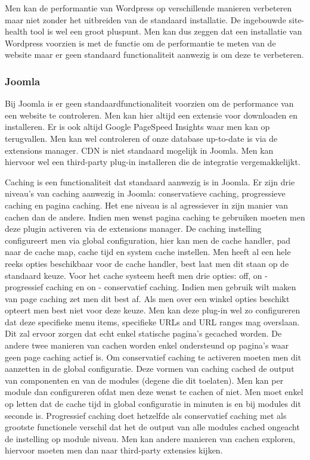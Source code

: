 Men kan de performantie van Wordpress op verschillende manieren verbeteren maar niet zonder het uitbreiden van de standaard installatie. De ingebouwde site-health tool is wel een groot pluspunt. Men kan dus zeggen dat een installatie van Wordpress voorzien is met de functie om de performantie te meten van de website maar er geen standaard functionaliteit aanwezig is om deze te verbeteren.

\subsubsection{Joomla}
Bij Joomla is er geen standaardfunctionaliteit voorzien om de performance van een website te controleren. Men kan hier altijd een extensie voor downloaden en installeren. Er is ook altijd Google PageSpeed Insights waar men kan op terugvallen. Men kan wel controleren of onze database up-to-date is via de extensions manager. CDN is niet standaard mogelijk in Joomla. Men kan hiervoor wel een third-party plug-in installeren die de integratie vergemakkelijkt.

Caching is een functionaliteit dat standaard aanwezig is in Joomla. Er zijn drie niveau's van caching aanwezig in Joomla: conservatieve caching, progressieve caching en pagina caching. Het ene niveau is al agressiever in zijn manier van cachen dan de andere. Indien men wenst pagina caching te gebruiken moeten men deze plugin activeren via de extensions manager. De caching instelling configureert men via global configuration, hier kan men de cache handler, pad naar de cache map, cache tijd en system cache instellen. Men heeft al een hele reeks opties beschikbaar voor de cache handler, best laat men dit staan op de standaard keuze. Voor het cache systeem heeft men drie opties: off, on - progressief caching en on - conservatief caching. Indien men gebruik wilt maken van page caching zet men dit best af. Als men over een winkel opties beschikt opteert men best niet voor deze keuze. Men kan deze plug-in wel zo configureren dat deze specifieke menu items, specifieke URLs and URL ranges mag overslaan. Dit zal ervoor zorgen dat echt enkel statische pagina's gecached worden. De andere twee manieren van cachen worden enkel ondersteund op pagina's waar geen page caching actief is. Om conservatief caching te activeren moeten men dit aanzetten in de global configuratie. Deze vormen van caching cached de output van componenten en van de modules (degene die dit toelaten). Men kan per module dan configureren ofdat men deze wenst te cachen of niet. Men moet enkel op letten dat de cache tijd in global configuratie in minuten is en bij modules dit seconde is. Progressief caching doet hetzelfde als conservatief caching met als grootste functionele verschil dat het de output van alle modules cached ongeacht de instelling op module niveau. Men kan andere manieren van cachen exploren, hiervoor moeten men dan naar third-party extensies kijken. 

